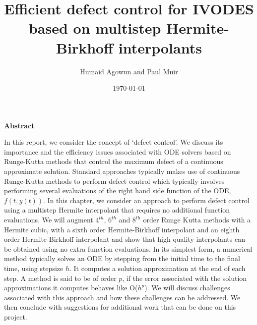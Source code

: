 \documentclass{article}
\begin{document}
\begin{titlepage}
\author{Humaid Agowun and Paul Muir} 
\title{Efficient defect control for IVODES based on multistep Hermite-Birkhoff interpolants
} 
\date{\today} 
\maketitle
\end{titlepage}

\begin{center}
    \textbf{Abstract}
\end{center}

In this report, we consider the concept of `defect control'. We discuss its importance and the efficiency issues associated with ODE solvers based on Runge-Kutta methods \cite{MR3822086} that control the maximum defect of a continuous approximate solution. Standard approaches typically makes use of continuous Runge-Kutta methods \cite{MR3822086} to perform defect control which typically involves performing several evaluations of the right hand side function of the ODE, $f(t, y(t))$. In this chapter, we consider an approach to perform defect control using a multistep Hermite interpolant \cite{MR3822086} that requires no additional function evaluations. We will augment $4^{th}$, $6^{th}$ and $8^{th}$ order Runge Kutta methods with a Hermite cubic, with a sixth order Hermite-Birkhoff interpolant and an eighth order Hermite-Birkhoff interpolant and show that high quality interpolants can be obtained using no extra function evaluations. In its simplest form, a numerical method typically solves an ODE by stepping from the initial time to the final time, using stepsize $h$. It computes a solution approximation at the end of each step. A method is said to be of order $p$, if the error associated with the solution approximations it computes behaves like O($h^p$). We will discuss challenges associated with this approach and how these challenges can be addressed. We then conclude with suggestions for additional work that can be done on this project.
















\end{document}
